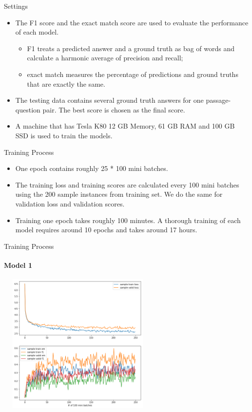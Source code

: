 \documentclass{beamer}
\begin{document}
\begin{frame}{Settings}
    \begin{itemize}
        \item The F1 score and the exact match score are used to evaluate the performance of each model.
            \begin{itemize}
                \item F1 treats a predicted answer and a ground truth as bag of words and calculate a harmonic average of precision and recall;
                \item exact match measures the percentage of predictions and ground truths that are exactly the same.
            \end{itemize}
        \item The testing data contains several ground truth answers for one passage-question pair. The best score is chosen as the final score.
        \item A machine that has Tesla K80 12 GB Memory, 61 GB RAM and 100 GB SSD is used to train the models.
    \end{itemize}
\end{frame}

\begin{frame}{Training Process}
    \begin{itemize}
        \item One epoch contains roughly 25 * 100 mini batches.
        \item The training loss and training scores are calculated every 100 mini batches using the 200 sample instances from training set. We do the same for validation loss and validation scores.
        \item Training one epoch takes roughly 100 minutes. A thorough training of each model requires around 10 epochs and takes around 17 hours.
    \end{itemize}
\end{frame}

\begin{frame}{Training Process}\framesubtitle{Model 1}
    \begin{center}
        \includegraphics[width=8cm, height=7cm]{figures/match_corrected.png}
    \end{center}

\end{frame}
\end{document}
